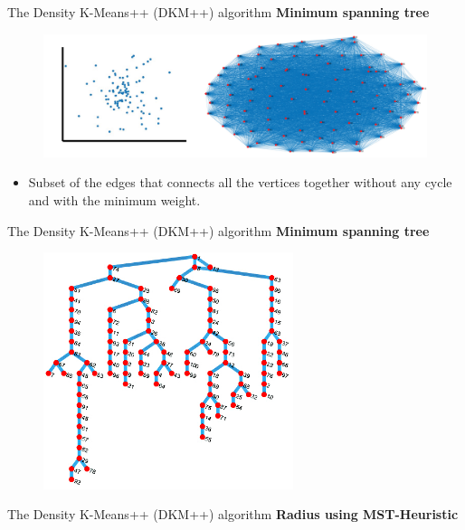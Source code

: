 \documentclass{beamer}
\newlength{\tmpShadow}
\newcommand{\MyShadow}[2]{%
	\settowidth{\tmpShadow}{#1}
	\addtolength{\tmpShadow}{.1em}
	\raisebox{-0.25ex}{\textcolor{gray!70}{#1}}%
	\kern-\tmpShadow%
	\textcolor{#2}{#1}%
}
\begin{document}
{\begin{frame}{The Density K-Means++ (DKM++) algorithm}
\textbf{Minimum spanning tree}
	\vspace{10mm}
	\begin{figure}[H]
		\centering
		\includegraphics[width=\textwidth]{figures/MinSpTr}
	\end{figure}
	\vspace{5mm}
	\begin{itemize}[label={\MyShadow{$\bullet$}{blue!80}}]
		\item<2-> Subset of the edges that connects all the vertices together without any cycle and with the minimum weight. 
	\end{itemize}
	\vspace{20mm}
\end{frame}
\begin{frame}{The Density K-Means++ (DKM++) algorithm}
	\textbf{Minimum spanning tree}
	\begin{figure}[H]
		\centering
		\includegraphics[width=0.65\textwidth]{figures/mstq}
	\end{figure}
\end{frame}
\begin{frame}{The Density K-Means++ (DKM++) algorithm}
	\textbf{Radius using MST-Heuristic}\\
	\vspace{10mm}

\end{frame}}
\end{document}
